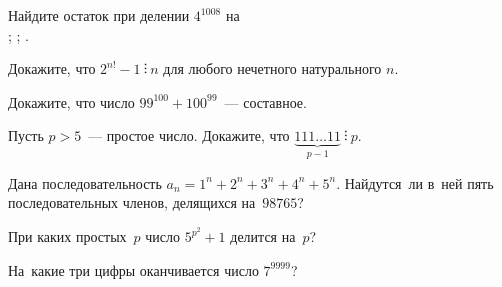 


\begingroup
    \ifdefined\threedotcolon
        \def\kratno{\mathrel{\threedotcolon}}%
    \fi

\begin{problems}

\item
Найдите остаток при делении $4^{1008}$ на\\
;
\quad
{};
\quad
{}.


\item
Докажите, что $2^{n!} - 1 \kratno n$ для любого нечетного натурального $n$.

\item
Докажите, что число $99^{100} + 100^{99}$~--- составное.

\item
Пусть $p > 5$~--- простое число.
Докажите, что
\(
    \underbrace{111{\ldots}11}_{\text{$p-1$}}
\kratno
    p
\).

\item
Дана последовательность $a_n = 1^n + 2^n + 3^n + 4^n + 5^n$.
Найдутся~ли в~ней пять последовательных членов, делящихся на~$98765$?

\item
При каких простых~$p$ число $5^{p^2} + 1$ делится на~$p$?




\item
На~какие три цифры оканчивается число $7^{9999}$?


\end{problems}
